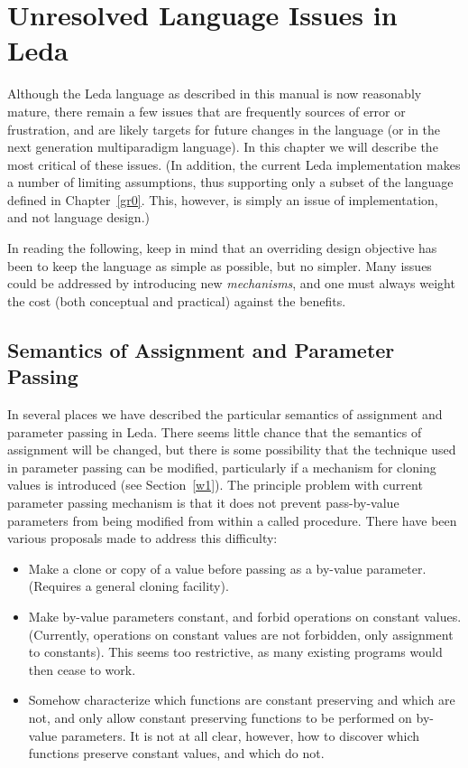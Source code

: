 \chapter{Unresolved Language Issues in Leda}\label{w0}

Although the Leda language as described in this manual is now reasonably
mature, there remain a few issues that are frequently
sources of error or frustration, and are likely targets for future changes
in the language (or in the next generation multiparadigm language).
In this chapter we will describe the most critical of these issues.
(In addition, the current Leda implementation makes a number of limiting
assumptions, thus supporting only a subset of the language defined
in Chapter~\ref{gr0}.
This, however, is simply an issue of implementation, and not language
design.)

In reading the following, keep in mind that an overriding design
objective has been to keep the language as simple as possible, but no
simpler.  Many issues could be addressed by introducing new {\em mechanisms},
and one must always weight the cost (both conceptual and practical) against
the benefits.

\section{Semantics of Assignment and Parameter Passing}

In several places we have
described the particular semantics of assignment and parameter passing
in Leda.  There seems little chance that the semantics of assignment
will be changed, but there is some possibility that the technique used
in parameter passing can be modified, particularly if a mechanism
for cloning values is introduced (see Section~\ref{w1}).
The principle problem with current parameter passing mechanism is that
it does not prevent pass-by-value parameters from being modified from within
a called procedure.  There have been various proposals made to address this
difficulty:

\begin{itemize}
\item
Make a clone or copy of a value before passing as a by-value parameter.
(Requires a general cloning facility).
\item
Make by-value parameters constant, and forbid operations on constant
values.  (Currently, operations on constant values are not forbidden,
only assignment to constants).  This seems too restrictive, as many
existing programs would then cease to work.
\item
Somehow characterize which functions are constant preserving and
which are not, and only allow constant preserving functions to
be performed on by-value parameters.
It is not at all clear, however, how to discover which functions
preserve constant values, and which do not.
\end{itemize}

